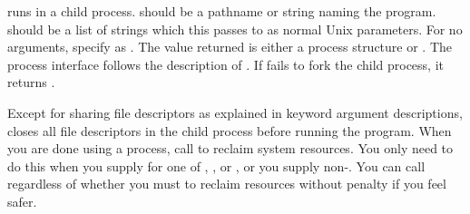  runs  in a child process.
 should be a pathname or string naming the program.
 should be a list of strings which this passes to
 as normal Unix parameters.  For no arguments, specify
 as \nil.  The value returned is either a process structure or
\nil.  The process interface follows the description of
.  If  fails to fork the child
process, it returns \nil.

Except for sharing file descriptors as explained in keyword argument
descriptions,  closes all file descriptors in the
child process before running the program.  When you are done using a
process, call  to reclaim system resources.  You
only need to do this when you supply  for one of
, , or , or you supply
 non-\nil.  You can call  regardless of
whether you must to reclaim resources without penalty if you feel safer.

